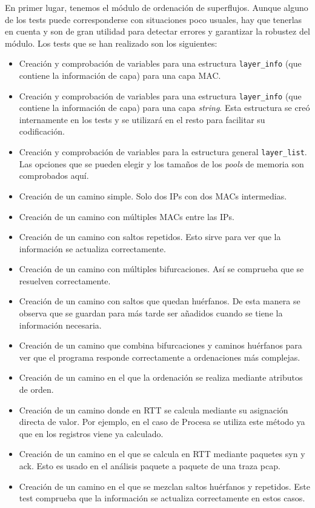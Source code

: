\documentclass[tfg,epsbased,lof,lot,loa,covers,final,copyright,overleaf]{tfgtfmthesisuam}
\begin{document}
En primer lugar, tenemos el módulo de ordenación de superflujos. Aunque alguno de los tests puede corresponderse con situaciones poco usuales, hay que tenerlas en cuenta y son de gran utilidad para detectar errores y garantizar la robustez del módulo. Los tests que se han realizado son los siguientes:
\begin{itemize}
	\item Creación y comprobación de variables para una estructura \texttt{layer\_info} (que contiene la información de capa) para una capa MAC.
	\item Creación y comprobación de variables para una estructura \texttt{layer\_info} (que contiene la información de capa) para una capa \textit{string}. Esta estructura se creó internamente en los tests y se utilizará en el resto para facilitar su codificación.
	\item Creación y comprobación de variables para la estructura general \texttt{layer\_list}. Las opciones que se pueden elegir y los tamaños de los \textit{pools} de memoria son comprobados aquí.
	\item Creación de un camino simple. Solo dos IPs con dos MACs intermedias.
	\item Creación de un camino con múltiples MACs entre las IPs.
	\item Creación de un camino con saltos repetidos. Esto sirve para ver que la información se actualiza correctamente.
	\item Creación de un camino con múltiples bifurcaciones. Así se comprueba que se resuelven correctamente.
	\item Creación de un camino con saltos que quedan huérfanos. De esta manera se observa que se guardan para más tarde ser añadidos cuando se tiene la información necesaria.
	\item Creación de un camino que combina bifurcaciones y caminos huérfanos para ver que el programa responde correctamente a ordenaciones más complejas.
	\item Creación de un camino en el que la ordenación se realiza mediante atributos de orden.
	\item Creación de un camino donde en RTT se calcula mediante su asignación directa de valor. Por ejemplo, en el caso de Procesa se utiliza este método ya que en los registros viene ya calculado.
	\item Creación de un camino en el que se calcula en RTT mediante paquetes \gls{syn} y \gls{ack}. Esto es usado en el análisis paquete a paquete de una traza pcap.
	\item Creación de un camino en el que se mezclan saltos huérfanos y repetidos. Este test comprueba que la información se actualiza correctamente en estos casos.
\end{itemize}
\end{document}
